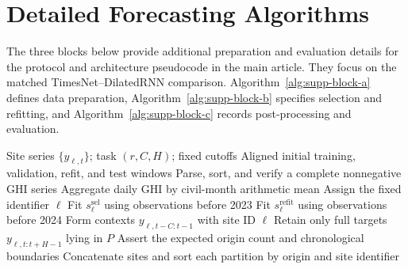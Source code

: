 \section{Detailed Forecasting Algorithms}

The three blocks below provide additional preparation and evaluation details
for the protocol and architecture pseudocode in the main article. They focus
on the matched TimesNet--DilatedRNN comparison.
Algorithm~\ref{alg:supp-block-a} defines data preparation,
Algorithm~\ref{alg:supp-block-b} specifies selection and refitting, and
Algorithm~\ref{alg:supp-block-c} records post-processing and evaluation.

\setcounter{algorithm}{0}
\renewcommand{\thealgorithm}{S\arabic{algorithm}}

\begin{algorithm}[H]
\caption{Leakage-controlled data preparation}
\label{alg:supp-block-a}
\footnotesize
\begin{algorithmic}[1]
\Require Site series $\{y_{\ell,t}\}$; task $(r,C,H)$; fixed cutoffs
\Ensure Aligned initial training, validation, refit, and test windows
  \State Parse, sort, and verify a complete nonnegative GHI series
    \State Aggregate daily GHI by civil-month arithmetic mean
  \EndIf
  \State Assign the fixed identifier $\ell$
  \State Fit $s_{\ell}^{\mathrm{sel}}$ using observations before 2023
  \State Fit $s_{\ell}^{\mathrm{refit}}$ using observations before 2024
    \State Form contexts $y_{\ell,t-C:t-1}$ with site ID $\ell$
    \State Retain only full targets $y_{\ell,t:t+H-1}$ lying in $P$
    \State Assert the expected origin count and chronological boundaries
  \EndFor
\EndFor
\State Concatenate sites and sort each partition by origin and site identifier
\end{algorithmic}
\end{algorithm}

